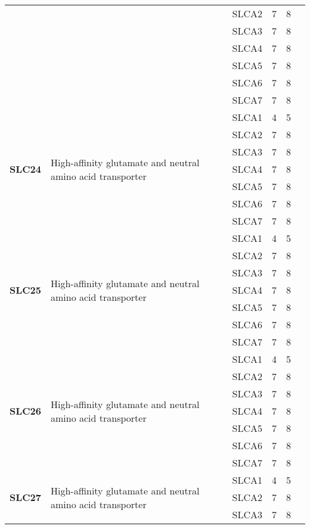 \documentclass[12pt]{report}
\begin{document}
\begin{center}
\begin{longtable}{|p{1.5cm}|p{3.2cm}|p{1.9cm}|p{1.65cm}|p{3cm}|p{3cm}|}
\cline{3-6}
&&SLCA2&7 & 8&\\ 
\cline{3-6}
&&SLCA3&7 & 8&\\ 
\cline{3-6}
&&SLCA4&7 & 8&\\ 
\cline{3-6}
&&SLCA5&7 & 8&\\ 
\cline{3-6}
&&SLCA6&7 & 8&\\ 
\cline{3-6}
&&SLCA7&7 & 8&\\ 
\hline
\multirow{7}{1.5cm}{\textbf{SLC24}} & \multirow{7}{4cm}{High-affinity glutamate and neutral amino acid transporter} & SLCA1 & 4 & 5\\ 
\cline{3-6}
&&SLCA2&7 & 8&\\ 
\cline{3-6}
&&SLCA3&7 & 8&\\ 
\cline{3-6}
&&SLCA4&7 & 8&\\ 
\cline{3-6}
&&SLCA5&7 & 8&\\ 
\cline{3-6}
&&SLCA6&7 & 8&\\ 
\cline{3-6}
&&SLCA7&7 & 8&\\ 
\hline
\multirow{7}{1.5cm}{\textbf{SLC25}} & \multirow{7}{4cm}{High-affinity glutamate and neutral amino acid transporter} & SLCA1 & 4 & 5\\ 
\cline{3-6}
&&SLCA2&7 & 8&\\ 
\cline{3-6}
&&SLCA3&7 & 8&\\ 
\cline{3-6}
&&SLCA4&7 & 8&\\ 
\cline{3-6}
&&SLCA5&7 & 8&\\ 
\cline{3-6}
&&SLCA6&7 & 8&\\ 
\cline{3-6}
&&SLCA7&7 & 8&\\ 
\hline
\multirow{7}{1.5cm}{\textbf{SLC26}} & \multirow{7}{4cm}{High-affinity glutamate and neutral amino acid transporter} & SLCA1 & 4 & 5\\ 
\cline{3-6}
&&SLCA2&7 & 8&\\ 
\cline{3-6}
&&SLCA3&7 & 8&\\ 
\cline{3-6}
&&SLCA4&7 & 8&\\ 
\cline{3-6}
&&SLCA5&7 & 8&\\ 
\cline{3-6}
&&SLCA6&7 & 8&\\ 
\cline{3-6}
&&SLCA7&7 & 8&\\ 
\hline
\multirow{7}{1.5cm}{\textbf{SLC27}} & \multirow{7}{4cm}{High-affinity glutamate and neutral amino acid transporter} & SLCA1 & 4 & 5\\ 
\cline{3-6}
&&SLCA2&7 & 8&\\ 
\cline{3-6}
&&SLCA3&7 & 8&\\ 

\end{longtable}
\end{center}
\end{document}

